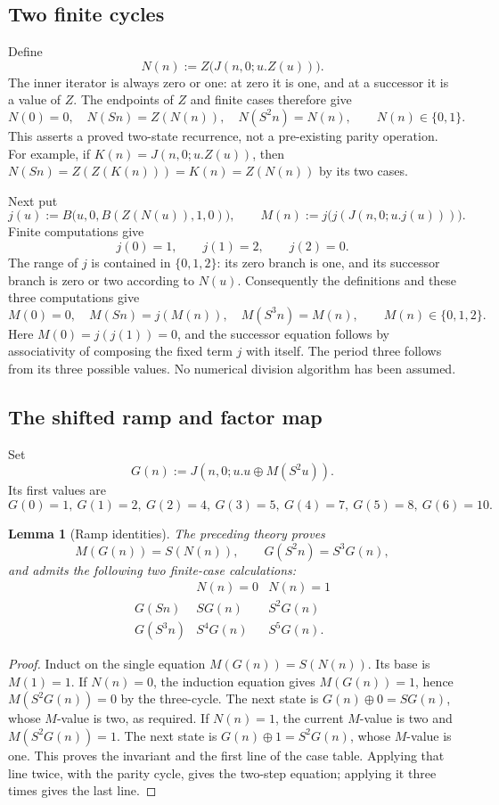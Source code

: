 \documentclass[11pt]{article}
\newtheorem{lemma}[theorem]{Lemma}
\theoremstyle{definition}
\begin{document}
\subsection{Two finite cycles}\label{js:cycles}

Define
\[
 N(n):=Z\bigl(J(n,0;u.Z(u))\bigr).
\]
The inner iterator is always zero or one: at zero it is one, and at a
successor it is a value of $Z$.  The endpoints of $Z$ and finite cases
therefore give
\[
 N(0)=0,\quad N(Sn)=Z(N(n)),\quad N(S^2n)=N(n),
 \qquad N(n)\in\{0,1\}.
 \tag{Parity cycle}\label{js:parity}
\]
This asserts a proved two-state recurrence, not a pre-existing parity
operation.  For example, if $K(n)=J(n,0;u.Z(u))$, then
$N(Sn)=Z(Z(K(n)))=K(n)=Z(N(n))$ by its two cases.

Next put
\[
 j(u):=B\bigl(u,0,B(Z(N(u)),1,0)\bigr),\qquad
 M(n):=j\bigl(j(J(n,0;u.j(u)))\bigr).
\]
Finite computations give
\[
 j(0)=1,\qquad j(1)=2,\qquad j(2)=0.
\]
The range of $j$ is contained in $\{0,1,2\}$: its zero branch is
one, and its successor branch is zero or two according to $N(u)$.
Consequently the definitions and these three computations give
\[
 M(0)=0,\quad M(Sn)=j(M(n)),\quad M(S^3n)=M(n),
 \qquad M(n)\in\{0,1,2\}.
 \tag{Three-cycle}\label{js:three-cycle}
\]
Here $M(0)=j(j(1))=0$, and the successor equation follows by
associativity of composing the fixed term $j$ with itself.  The period
three follows from its three possible values.  No numerical division
algorithm has been assumed.

\subsection{The shifted ramp and factor map}

Set
\[
 G(n):=J(n,0;u.u\oplus M(S^2u)).
\]
Its first values are
\[
 G(0)=1,\ G(1)=2,\ G(2)=4,\ G(3)=5,\
 G(4)=7,\ G(5)=8,\ G(6)=10.
\]

\begin{lemma}[Ramp identities]\label{js:ramp}
The preceding theory proves
\[
 M(G(n))=S(N(n)),\qquad G(S^2n)=S^3G(n),
 \tag{Ramp}\label{js:ramp-identities}
\]
and admits the following two finite-case calculations:
\[
 \begin{array}{c|cc}
 &N(n)=0&N(n)=1\\ \hline
 G(Sn)&S G(n)&S^2G(n)\\
 G(S^3n)&S^4G(n)&S^5G(n).
 \end{array}
 \tag{Ramp cases}\label{js:ramp-cases}
\]
\end{lemma}
\begin{proof}
Induct on the single equation $M(G(n))=S(N(n))$.
Its base is $M(1)=1$.  If $N(n)=0$, the induction equation gives
$M(G(n))=1$, hence $M(S^2G(n))=0$ by the three-cycle.  The next
state is $G(n)\oplus0=S G(n)$, whose $M$-value is two, as
required.  If $N(n)=1$, the current $M$-value is two and
$M(S^2G(n))=1$.  The next state is
$G(n)\oplus1=S^2G(n)$, whose $M$-value is one.  This proves
the invariant and the first line of the case table.  Applying that line
twice, with the parity cycle, gives the two-step equation; applying it
three times gives the last line.
\end{proof}
\end{document}
